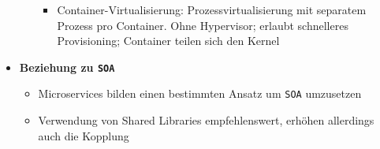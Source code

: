 \begin{itemize}
\begin{itemize}
\begin{itemize}
			\item Container-Virtualisierung: Prozessvirtualisierung mit separatem Prozess pro Container. Ohne Hypervisor; erlaubt schnelleres Provisioning; Container teilen sich den Kernel
		\end{itemize}
	\end{itemize}
	\item \textbf{Beziehung zu \texttt{SOA}}
	\begin{itemize}
		\item Microservices bilden einen bestimmten Ansatz um \texttt{SOA} umzusetzen
		\item Verwendung von Shared Libraries empfehlenswert, erhöhen allerdings auch die Kopplung
	\end{itemize}
\end{itemize}


